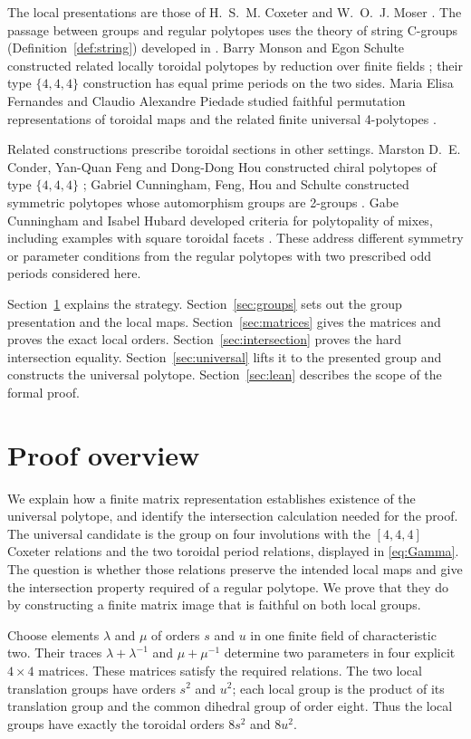 \documentclass[11pt]{article}
\theoremstyle{definition}
\begin{document}
The local presentations are those of H.~S.~M. Coxeter and W.~O.~J. Moser
\cite[Section 8.3]{CM}. The passage between groups and regular polytopes
uses the theory of string C-groups (Definition~\ref{def:string}) developed
in \cite[Section 2E]{ARP}.
Barry Monson and Egon Schulte constructed related locally toroidal
polytopes by reduction over finite fields \cite{MonS}; their type
$\{4,4,4\}$ construction has equal prime periods on the two sides.
Maria Elisa Fernandes and Claudio Alexandre Piedade studied faithful
permutation representations of toroidal maps \cite{FPmaps} and the
related finite universal 4-polytopes \cite{FPdegrees}.

Related constructions prescribe toroidal sections in other settings.
Marston D.~E. Conder, Yan-Quan Feng and Dong-Dong Hou constructed chiral
polytopes of type $\{4,4,4\}$ \cite{CFH}; Gabriel Cunningham, Feng, Hou
and Schulte constructed symmetric polytopes whose automorphism groups
are 2-groups \cite{CFHS}. Gabe Cunningham and Isabel Hubard developed
criteria for polytopality of mixes, including examples with square
toroidal facets \cite{CH}. These address different symmetry or parameter
conditions from the regular polytopes with two prescribed odd periods
considered here.

Section~\ref{sec:overview} explains the strategy.
Section~\ref{sec:groups} sets out the group presentation and the local
maps. Section~\ref{sec:matrices} gives the matrices and proves the exact
local orders. Section~\ref{sec:intersection} proves the hard intersection
equality. Section~\ref{sec:universal} lifts it to the presented group and
constructs the universal polytope. Section~\ref{sec:lean} describes the
scope of the formal proof.


\section{Proof overview}\label{sec:overview}
We explain how a finite matrix representation establishes existence of the
universal polytope, and identify the intersection calculation needed for the proof.
The universal candidate is the group on four involutions with the
$[4,4,4]$ Coxeter relations and the two toroidal period relations,
displayed in \eqref{eq:Gamma}.
The question is whether those relations preserve the intended local
maps and give the intersection property required of a regular polytope.
We prove that they do by constructing a finite matrix image that is
faithful on both local groups.

Choose elements $\lambda$ and $\mu$ of orders $s$ and $u$ in one finite
field of characteristic two. Their traces $\lambda+\lambda^{-1}$ and
$\mu+\mu^{-1}$ determine two parameters in four explicit $4\times4$
matrices. These matrices satisfy the required relations. The two local
translation groups have orders $s^2$ and $u^2$; each local group is the
product of its translation group and the common dihedral group of order
eight. Thus the local groups have exactly the toroidal orders $8s^2$
and $8u^2$.
\end{document}
